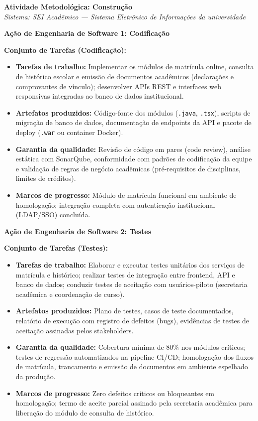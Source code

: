 \documentclass[12pt,a4paper]{article}
\begin{document}
\begin{tcolorbox}[respostabox]
\textbf{Atividade Metodológica: Construção}\\
\textit{Sistema: SEI Acadêmico --- Sistema Eletrônico de Informações da universidade}

\vspace{0.3cm}

\textbf{Ação de Engenharia de Software 1: Codificação}

\textbf{Conjunto de Tarefas (Codificação):}
\begin{itemize}
    \item \textbf{Tarefas de trabalho:} Implementar os módulos de matrícula online, consulta de histórico escolar e emissão de documentos acadêmicos (declarações e comprovantes de vínculo); desenvolver APIs REST e interfaces web responsivas integradas ao banco de dados institucional.
    \item \textbf{Artefatos produzidos:} Código-fonte dos módulos (\texttt{.java}, \texttt{.tsx}), scripts de migração de banco de dados, documentação de endpoints da API e pacote de deploy (\texttt{.war} ou container Docker).
    \item \textbf{Garantia da qualidade:} Revisão de código em pares (code review), análise estática com SonarQube, conformidade com padrões de codificação da equipe e validação de regras de negócio acadêmicas (pré-requisitos de disciplinas, limites de créditos).
    \item \textbf{Marcos de progresso:} Módulo de matrícula funcional em ambiente de homologação; integração completa com autenticação institucional (LDAP/SSO) concluída.
\end{itemize}

\vspace{0.3cm}

\textbf{Ação de Engenharia de Software 2: Testes}

\textbf{Conjunto de Tarefas (Testes):}
\begin{itemize}
    \item \textbf{Tarefas de trabalho:} Elaborar e executar testes unitários dos serviços de matrícula e histórico; realizar testes de integração entre frontend, API e banco de dados; conduzir testes de aceitação com usuários-piloto (secretaria acadêmica e coordenação de curso).
    \item \textbf{Artefatos produzidos:} Plano de testes, casos de teste documentados, relatório de execução com registro de defeitos (bugs), evidências de testes de aceitação assinadas pelos stakeholders.
    \item \textbf{Garantia da qualidade:} Cobertura mínima de 80\% nos módulos críticos; testes de regressão automatizados na pipeline CI/CD; homologação dos fluxos de matrícula, trancamento e emissão de documentos em ambiente espelhado da produção.
    \item \textbf{Marcos de progresso:} Zero defeitos críticos ou bloqueantes em homologação; termo de aceite parcial assinado pela secretaria acadêmica para liberação do módulo de consulta de histórico.
\end{itemize}


\end{tcolorbox}
\end{document}
